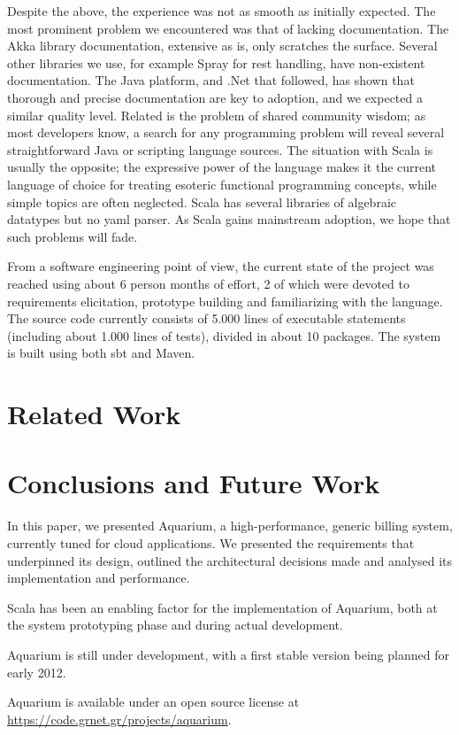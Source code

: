 \documentclass[preprint,10pt]{sigplanconf}
\begin{document}
Despite the above, the experience was not as smooth as initially expected. The
most prominent problem we encountered was that of lacking documentation. The
Akka library documentation, extensive as is, only scratches the surface.
Several other libraries we use, for example Spray for {\sc rest} handling, have
non-existent documentation. The Java platform, and .Net that followed, has
shown that thorough and precise documentation are key to adoption, and we
expected a similar quality level. Related is the problem of shared community
wisdom; as most developers know, a search for any programming problem will
reveal several straightforward Java or scripting language sources. The
situation with Scala is usually the opposite; the expressive power of the
language makes it the current language of choice for treating esoteric
functional programming concepts, while simple topics are often neglected. Scala
has several libraries of algebraic datatypes but no {\sc yaml} parser. As Scala
gains mainstream adoption, we hope that such problems will fade.

From a software engineering point of view, the current state of the project was
reached using about 6 person months of effort, 2 of which were devoted to
requirements elicitation, prototype building and familiarizing with the
language. The source code currently consists of 5.000 lines of executable
statements (including about 1.000 lines of tests), divided in about 10
packages. The system is built using both {\sc sbt} and Maven. 

\section{Related Work}

\section{Conclusions and Future Work}
In this paper, we presented Aquarium, a high-performance, generic billing 
system, currently tuned for cloud applications. We presented the requirements
that underpinned its design, outlined the architectural decisions made
and analysed its implementation and performance.

Scala has been an enabling factor for the implementation of Aquarium, both
at the system prototyping phase and during actual development. 

Aquarium is still under development, with a first stable version 
being planned for early 2012. 

Aquarium is available under an open source license at 
\url{https://code.grnet.gr/projects/aquarium}.



\end{document}
